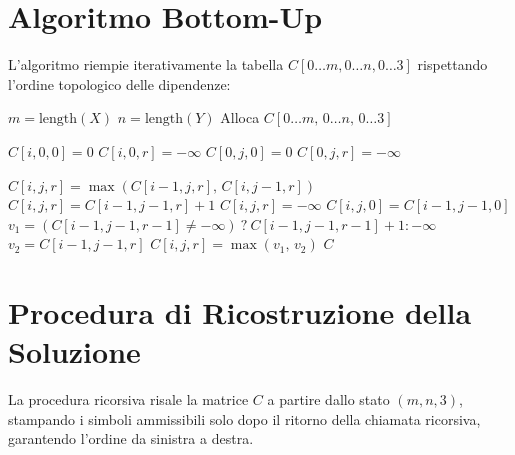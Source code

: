 \section{Algoritmo Bottom-Up}
L'algoritmo riempie iterativamente la tabella $C[0 \dots m, 0 \dots n, 0 \dots 3]$ rispettando l'ordine topologico delle dipendenze:

\begin{algorithm}[H]
\caption{Costruzione Bottom-Up per LCS con esattamente 3 rossi}
\begin{algorithmic}[1]
    \State $m = \text{length}(X)$
    \State $n = \text{length}(Y)$
    \State Alloca $C[0 \dots m, \, 0 \dots n, \, 0 \dots 3]$
    
    \Statex {}
        \State $C[i, 0, 0] = 0$
            \State $C[i, 0, r] = -\infty$
        \EndFor
    \EndFor
        \State $C[0, j, 0] = 0$
            \State $C[0, j, r] = -\infty$
        \EndFor
    \EndFor

    \Statex {}
                    \State $C[i, j, r] = \max(C[i-1, j, r], \, C[i, j-1, r])$
                        \State $C[i, j, r] = C[i-1, j-1, r] + 1$
                    \Else
                        \State $C[i, j, r] = -\infty$
                    \EndIf
                \Else {}
                        \State $C[i, j, 0] = C[i-1, j-1, 0]$
                    \Else
                        \State $v_1 = (C[i-1, j-1, r-1] \neq -\infty) \ ? \ C[i-1, j-1, r-1] + 1 : -\infty$
                        \State $v_2 = C[i-1, j-1, r]$
                        \State $C[i, j, r] = \max(v_1, \, v_2)$
                    \EndIf
                \EndIf
            \EndFor
        \EndFor
    \EndFor
    \State \Return $C$
\EndProcedure
\end{algorithmic}
\end{algorithm}

\section{Procedura di Ricostruzione della Soluzione}
La procedura ricorsiva risale la matrice $C$ a partire dallo stato $(m, n, 3)$, stampando i simboli ammissibili solo dopo il ritorno della chiamata ricorsiva, garantendo l'ordine da sinistra a destra.

